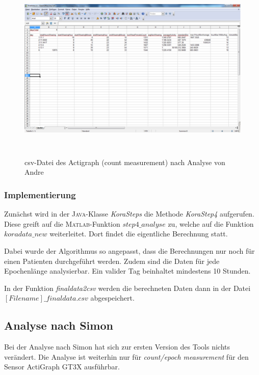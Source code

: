 \documentclass[onecolumn,german]{article}
\begin{document}
\begin{figure}[H]
\centerline{
\includegraphics[width=140mm, height=90mm]{Abbildungen/csv_andre.png}
}
\caption {csv-Datei des Actigraph (count measurement) nach Analyse von Andre}
\label{andre}
\end{figure}

\subsubsection{Implementierung}
Zunächst wird in der \textsc{Java}-Klasse \textit{KoraSteps} die Methode \textit{KoraStep4} aufgerufen. Diese greift auf die \textsc{Matlab}-Funktion \textit{$step4\_analyse$} zu, welche auf die Funktion \textit{$koradata\_new$} weiterleitet. Dort findet die eigentliche Berechnung statt.\newline

Dabei wurde der Algorithmus so angepasst, dass die Berechnungen nur noch für einen Patienten durchgeführt werden. Zudem sind die Daten für jede Epochenlänge analysierbar. Ein valider Tag beinhaltet mindestens 10 Stunden.\newline

In der Funktion \textit{finaldata2csv} werden die berechneten Daten dann in der Datei \textit{$[Filename]\_finaldata.csv$} abgespeichert.


\subsection{Analyse nach Simon}

Bei der Analyse nach Simon hat sich zur ersten Version des Tools nichts verändert.
Die Analyse ist weiterhin nur für \textit{count/epoch measurement} für den Sensor ActiGraph GT3X ausführbar.
\end{document}
